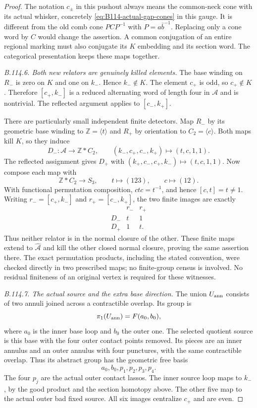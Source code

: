 \begin{proof}
The notation $c_\pm$ in this pushout always means the common-neck
cone with its actual whisker, concretely
\eqref{eq:B114-actual-gap-cones} in this gauge. It is different
from the old comb cone $P C P^{-1}$ with $P=a\bar b^{-1}$.
Replacing only a cone word by $C$ would change the assertion.
A common conjugation of an entire regional marking must also
conjugate its $K$ embedding and its section word. The categorical
presentation keeps these maps together.

\emph{B.114.6. Both new relators are genuinely killed elements.}
The base winding on $R_-$ is zero on $K$ and one on $k_-$.
Hence $k_-\notin K$. The element $c_+$ is odd, so $c_+\notin K$.
Therefore $[c_+,k_-]$ is a reduced alternating word of length
four in $\mathcal A$ and is nontrivial. The reflected argument
applies to $[c_-,k_+]$.

There are particularly small independent finite detectors. Map
$R_-$ by its geometric base winding to $\mathbb Z=\langle t\rangle$
and $R_+$ by orientation to $C_2=\langle c\rangle$.
Both maps kill $K$, so they induce
\[
 D_-:\mathcal A\longrightarrow\mathbb Z*C_2,
 \qquad (k_-,c_+,c_-,k_+)\longmapsto(t,c,1,1).
\]
The reflected assignment gives $D_+$ with
$(k_+,c_-,c_+,k_-)\mapsto(t,c,1,1)$.
Now compose each map with
\[
 \mathbb Z*C_2\longrightarrow S_3,
 \qquad t\longmapsto(123),\qquad c\longmapsto(12).
\]
With functional permutation composition, $ctc=t^{-1}$, and hence
$[c,t]=t\ne1$. Writing $r_-=[c_+,k_-]$ and
$r_+=[c_-,k_+]$, the two finite images are exactly
\begin{equation}\label{eq:B114-two-detectors}
 \begin{array}{c|cc}
       &r_-&r_+\\\hline
 D_-   &t&1\\
 D_+   &1&t.
 \end{array}
\end{equation}
Thus neither relator is in the normal closure of the other.
These finite maps extend to $\widehat{\mathcal A}$ and kill the
other closed normal closure, proving the same assertion there.
The exact permutation products, including the stated convention,
were checked directly in two prescribed maps; no finite-group
census is involved. No residual finiteness of an original vertex
is required for these witnesses.

\emph{B.114.7. The actual source and the extra base direction.}
The union $U_{\rm ann}$ consists of two annuli joined across a
contractible overlap. Its group is
\[
 \pi_1(U_{\rm ann})=F(a_0,b_0),
\]
where $a_0$ is the inner base loop and $b_0$ the outer one.
The selected quotient source is this base with the four outer
contact points removed. Its pieces are an inner annulus and an
outer annulus with four punctures, with the same contractible
overlap. Thus its abstract group has the geometric free basis
\[
 a_0,b_0,p_1,p_2,p_3,p_4.
\]
The four $p_j$ are the actual outer contact lassos. The inner
source loop maps to $k_-$, by the good product and the section
homotopy above. The other five map to the actual outer bad
fixed source. All six images centralize $c_+$ and are even.


\end{proof}
